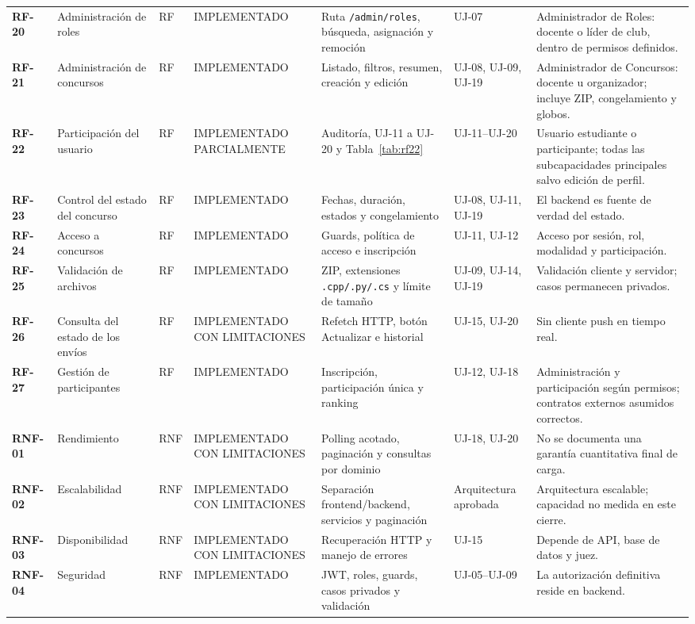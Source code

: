 \documentclass[11pt,a4paper]{article}
\begin{document}
\begin{landscape}
\begin{longtable}{>{\bfseries}p{1.25cm}p{4.0cm}p{1.15cm}p{3.35cm}p{4.5cm}p{4.0cm}p{5.1cm}}
RF-20 & Administración de roles & RF & IMPLEMENTADO & Ruta \texttt{/admin/roles}, búsqueda, asignación y remoción & UJ-07 & Administrador de Roles: docente o líder de club, dentro de permisos definidos. \\
RF-21 & Administración de concursos & RF & IMPLEMENTADO & Listado, filtros, resumen, creación y edición & UJ-08, UJ-09, UJ-19 & Administrador de Concursos: docente u organizador; incluye ZIP, congelamiento y globos. \\
RF-22 & Participación del usuario & RF & IMPLEMENTADO PARCIALMENTE & Auditoría, UJ-11 a UJ-20 y Tabla~\ref{tab:rf22} & UJ-11--UJ-20 & Usuario estudiante o participante; todas las subcapacidades principales salvo edición de perfil. \\
RF-23 & Control del estado del concurso & RF & IMPLEMENTADO & Fechas, duración, estados y congelamiento & UJ-08, UJ-11, UJ-19 & El backend es fuente de verdad del estado. \\
RF-24 & Acceso a concursos & RF & IMPLEMENTADO & Guards, política de acceso e inscripción & UJ-11, UJ-12 & Acceso por sesión, rol, modalidad y participación. \\
RF-25 & Validación de archivos & RF & IMPLEMENTADO & ZIP, extensiones \texttt{.cpp/.py/.cs} y límite de tamaño & UJ-09, UJ-14, UJ-19 & Validación cliente y servidor; casos permanecen privados. \\
RF-26 & Consulta del estado de los envíos & RF & IMPLEMENTADO CON LIMITACIONES & Refetch HTTP, botón Actualizar e historial & UJ-15, UJ-20 & Sin cliente push en tiempo real. \\
RF-27 & Gestión de participantes & RF & IMPLEMENTADO & Inscripción, participación única y ranking & UJ-12, UJ-18 & Administración y participación según permisos; contratos externos asumidos correctos. \\
RNF-01 & Rendimiento & RNF & IMPLEMENTADO CON LIMITACIONES & Polling acotado, paginación y consultas por dominio & UJ-18, UJ-20 & No se documenta una garantía cuantitativa final de carga. \\
RNF-02 & Escalabilidad & RNF & IMPLEMENTADO CON LIMITACIONES & Separación frontend/backend, servicios y paginación & Arquitectura aprobada & Arquitectura escalable; capacidad no medida en este cierre. \\
RNF-03 & Disponibilidad & RNF & IMPLEMENTADO CON LIMITACIONES & Recuperación HTTP y manejo de errores & UJ-15 & Depende de API, base de datos y juez. \\
RNF-04 & Seguridad & RNF & IMPLEMENTADO & JWT, roles, guards, casos privados y validación & UJ-05--UJ-09 & La autorización definitiva reside en backend. \\

\end{longtable}
\end{landscape}
\end{document}
